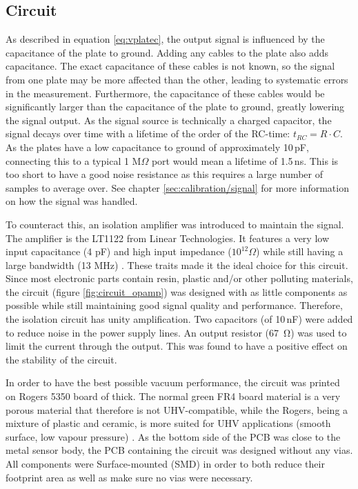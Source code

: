 \subsection{Circuit}
\label{sec:design/circuit}
As described in equation \ref{eq:vplatec}, the output signal is influenced by the capacitance of the plate to ground. Adding any cables to the plate also adds capacitance. The exact capacitance of these cables is not known, so the signal from one plate may be more affected than the other, leading to systematic errors in the measurement.
Furthermore, the capacitance of these cables would be significantly larger than the capacitance of the plate to ground, greatly lowering the signal output.
As the signal source is technically a charged capacitor, the signal decays over time with a lifetime of the order of the RC-time: $t_{RC} = R\cdot C$. As the plates have a low capacitance to ground of approximately 10\,pF, connecting this to a typical 1 M$\Omega$ port would mean a lifetime of 1.5\,ns. This is too short to have a good noise resistance as this requires a large number of samples to average over. See chapter \ref{sec:calibration/signal} for more information on how the signal was handled.

To counteract this, an isolation amplifier was introduced to maintain the signal.
The amplifier is the LT1122 from Linear Technologies. It features a very low input capacitance (4 pF) and high input impedance ($10^{12} \Omega$) while still having a large bandwidth (13 MHz) \cite{LT1122}. These traits made it the ideal choice for this circuit.
Since most electronic parts contain resin, plastic and/or other polluting materials, the circuit (figure \ref{fig:circuit_opamp}) was designed with as little components as possible while still maintaining good signal quality and performance. Therefore, the isolation circuit has unity amplification. 
Two capacitors (of 10\,nF) were added to reduce noise in the power supply lines. An output resistor (\SI{67}{\ohm}) was used to limit the current through the output. This was found to have a positive effect on the stability of the circuit.

In order to have the best possible vacuum performance, the circuit was printed on Rogers 5350 board of  thick. The normal green FR4 board material is a very porous material that therefore is not UHV-compatible, while the Rogers, being a mixture of plastic and ceramic, is more suited for UHV applications (smooth surface, low vapour pressure) .
As the bottom side of the PCB was close to the metal sensor body, the PCB containing the circuit was designed without any vias. All components were Surface-mounted (SMD) in order to both reduce their footprint area as well as make sure no vias were necessary.

